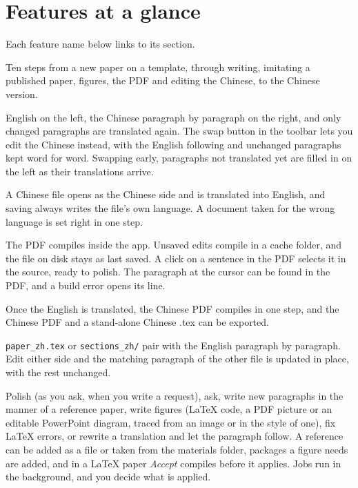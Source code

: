 \documentclass[a4paper,11pt]{article}
\newcommand{\ui}[1]{\emph{#1}}
\begin{document}
\section{Features at a glance}
\label{sec:overview}
Each feature name below links to its section.
\begin{description}[leftmargin=0pt, style=nextline]
\item[{\hyperref[sec:flow]{The writing workflow}}] Ten steps from a new paper on a template, through writing, imitating a published paper, figures, the PDF and editing the Chinese, to the Chinese version.
\item[{\hyperref[sec:write]{Bilingual writing}}] English on the left, the Chinese paragraph by paragraph on the right, and only changed paragraphs are translated again. The swap button in the toolbar lets you edit the Chinese instead, with the English following and unchanged paragraphs kept word for word. Swapping early, paragraphs not translated yet are filled in on the left as their translations arrive.
\item[{\hyperref[sec:zhfile]{A paper written in Chinese}}] A Chinese file opens as the Chinese side and is translated into English, and saving always writes the file's own language. A document taken for the wrong language is set right in one step.
\item[{\hyperref[sec:latex]{LaTeX builds and PDF navigation}}] The PDF compiles inside the app. Unsaved edits compile in a cache folder, and the file on disk stays as last saved. A click on a sentence in the PDF selects it in the source, ready to polish. The paragraph at the cursor can be found in the PDF, and a build error opens its line.
\item[{\hyperref[sec:zhpdf]{Chinese PDF}}] Once the English is translated, the Chinese PDF compiles in one step, and the Chinese PDF and a stand-alone Chinese .tex can be exported.
\item[{\hyperref[sec:pair]{Your existing Chinese version}}] \texttt{paper\_zh.tex} or \texttt{sections\_zh/} pair with the English paragraph by paragraph. Edit either side and the matching paragraph of the other file is updated in place, with the rest unchanged.
\item[{\hyperref[sec:assist]{Writing assistant}}] Polish (as you ask, when you write a request), ask, write new paragraphs in the manner of a reference paper, write figures (LaTeX code, a PDF picture or an editable PowerPoint diagram, traced from an image or in the style of one), fix LaTeX errors, or rewrite a translation and let the paragraph follow. A reference can be added as a file or taken from the materials folder, packages a figure needs are added, and in a LaTeX paper \ui{Accept} compiles before it applies. Jobs run in the background, and you decide what is applied.

\end{description}
\end{document}
